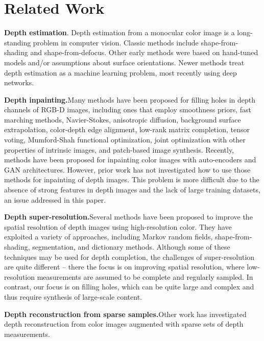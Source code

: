 \documentclass[10pt,twocolumn,letterpaper]{article}
\begin{document}
\section{Related Work}
\textbf{Depth estimation}. Depth estimation from a monocular color image is a long-standing problem in computer vision. Classic methods include shape-from-shading and shape-from-defocus. Other early methods were based on hand-tuned models and/or assumptions about surface orientations. Newer methods treat depth estimation as a machine learning problem, most recently using deep networks.\par
\textbf{Depth inpainting.}Many methods have been proposed for filling holes in depth channels of RGB-D images, including ones that employ smoothness priors, fast marching methods, Navier-Stokes, anisotropic diffusion, background surface extrapolation, color-depth edge alignment, low-rank matrix completion, tensor voting, Mumford-Shah functional optimization, joint optimization with other properties of intrinsic images, and patch-based image synthesis. Recently, methods have been proposed for inpainting color images with auto-encoders and GAN architectures. However, prior work has not investigated how to use those methods for inpainting of depth images. This problem is more difficult due to the absence of strong features in depth images and the lack of large training datasets, an issue addressed in this paper.\par
\textbf{Depth super-resolution.}Several methods have been proposed to improve the spatial resolution of depth images using high-resolution color. They have exploited a variety of approaches, including Markov random fields, shape-from-shading, segmentation, and dictionary methods. Although some of these techniques may be used for depth completion, the challenges of super-resolution are quite different – there the focus is on improving spatial resolution, where low-resolution measurements are assumed to be complete and regularly sampled. In contrast, our focus is on filling holes, which can be quite large and complex and thus require synthesis of large-scale content.\par
\textbf{Depth reconstruction from sparse samples.}Other work has investigated depth reconstruction from color images augmented with sparse sets of depth measurements.\par



{\small


}
\end{document}
